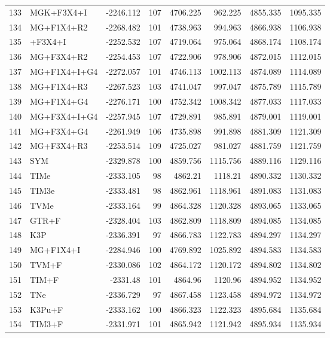 \documentclass[12pt]{article}
\begin{document}
\begin{longtable}{clrrrrrr}
	133 & MGK+F3X4+I & -2246.112 & 107 & 4706.225 & 962.225 & 4855.335 & 1095.335 \\ 
	134 & MG+F1X4+R2 & -2268.482 & 101 & 4738.963 & 994.963 & 4866.938 & 1106.938 \\ 
	135 & \gy+F3X4+I & -2252.532 & 107 & 4719.064 & 975.064 & 4868.174 & 1108.174 \\ 
	136 & MG+F3X4+R2 & -2254.453 & 107 & 4722.906 & 978.906 & 4872.015 & 1112.015 \\ 
	137 & MG+F1X4+I+G4 & -2272.057 & 101 & 4746.113 & 1002.113 & 4874.089 & 1114.089 \\ 
	138 & MG+F1X4+R3 & -2267.523 & 103 & 4741.047 & 997.047 & 4875.789 & 1115.789 \\ 
	139 & MG+F1X4+G4 & -2276.171 & 100 & 4752.342 & 1008.342 & 4877.033 & 1117.033 \\ 
	140 & MG+F3X4+I+G4 & -2257.945 & 107 & 4729.891 & 985.891 & 4879.001 & 1119.001 \\ 
	141 & MG+F3X4+G4 & -2261.949 & 106 & 4735.898 & 991.898 & 4881.309 & 1121.309 \\ 
	142 & MG+F3X4+R3 & -2253.514 & 109 & 4725.027 & 981.027 & 4881.759 & 1121.759 \\ 
	143 & SYM & -2329.878 & 100 & 4859.756 & 1115.756 & 4889.116 & 1129.116 \\ 
	144 & TIMe & -2333.105 & 98 & 4862.21 & 1118.21 & 4890.332 & 1130.332 \\ 
	145 & TIM3e & -2333.481 & 98 & 4862.961 & 1118.961 & 4891.083 & 1131.083 \\ 
	146 & TVMe & -2333.164 & 99 & 4864.328 & 1120.328 & 4893.065 & 1133.065 \\ 
	147 & GTR+F & -2328.404 & 103 & 4862.809 & 1118.809 & 4894.085 & 1134.085 \\ 
	148 & K3P & -2336.391 & 97 & 4866.783 & 1122.783 & 4894.297 & 1134.297 \\ 
	149 & MG+F1X4+I & -2284.946 & 100 & 4769.892 & 1025.892 & 4894.583 & 1134.583 \\ 
	150 & TVM+F & -2330.086 & 102 & 4864.172 & 1120.172 & 4894.802 & 1134.802 \\ 
	151 & TIM+F & -2331.48 & 101 & 4864.96 & 1120.96 & 4894.952 & 1134.952 \\ 
	152 & TNe & -2336.729 & 97 & 4867.458 & 1123.458 & 4894.972 & 1134.972 \\ 
	153 & K3Pu+F & -2333.162 & 100 & 4866.323 & 1122.323 & 4895.684 & 1135.684 \\ 
	154 & TIM3+F & -2331.971 & 101 & 4865.942 & 1121.942 & 4895.934 & 1135.934 \\ 

\end{longtable}
\end{document}

